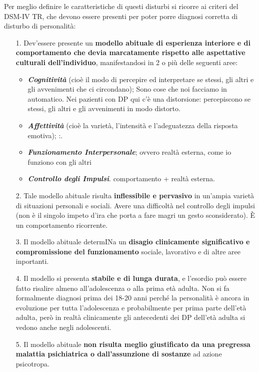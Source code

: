 Per meglio definire le caratteristiche di questi disturbi si ricorre ai
criteri del DSM-IV TR, che devono essere presenti per poter porre
diagnosi corretta di disturbo di personalità:

\begin{itemize}
\item[1.]
  Dev'essere presente un \textbf{modello abituale di esperienza
  interiore e di comportamento che devia marcatamente rispetto alle
  aspettative culturali dell'individuo}, manifestandosi in 2 o più delle
  seguenti aree:
  \begin{itemize}
\item
  \textbf{\emph{Cognitività}} (cioè il modo di percepire ed interpretare
  se stessi, gli altri e gli avvenimenti che ci circondano); Sono cose
  che noi facciamo in automatico. Nei pazienti con DP qui c'è una
  distorsione: percepiscono se stessi, gli altri e gli avvenimenti in
  modo distorto.
\item
  \textbf{\emph{Affettività}} (cioè la varietà, l'intensità e
  l'adeguatezza della risposta emotiva); :.
\item
  \textbf{\emph{Funzionamento Interpersonale}}; ovvero realtà esterna,
  come io funziono con gli altri
\item
  \textbf{\emph{Controllo degli Impulsi}}. comportamento + realtà
  esterna.
\end{itemize}
\item[2.]
  Tale modello abituale risulta \textbf{inflessibile e pervasivo} in
  un'ampia varietà di situazioni personali e sociali. Avere una
  difficoltà nel controllo degli impulsi (non è il singolo impeto d'ira
  che porta a fare magri un gesto sconsiderato). È un comportamento
  ricorrente.
\item[3.]
  Il modello abituale determINa un \textbf{disagio clinicamente
  significativo e compromissione del funzionamento} sociale, lavorativo
  e di altre aree inportanti.
\item[4.]
  Il modello si presenta \textbf{stabile e di lunga durata}, e l'esordio
  può essere fatto risalire almeno all'adolescenza o alla prima età
  adulta. Non si fa formalmente diagnosi prima dei 18-20 anni perché la
  personalità è ancora in evoluzione per tutta l'adolescenza e
  probabilmente per prima parte dell'età adulta, però in realtà
  clinicamente gli antecedenti dei DP dell'età adulta si vedono anche
  negli adolescenti.
\item[5.]
  Il modello abituale \textbf{non risulta meglio giustificato da una
  pregressa malattia psichiatrica o dall'assunzione di sostanze} ad
  azione psicotropa.
\end{itemize}

